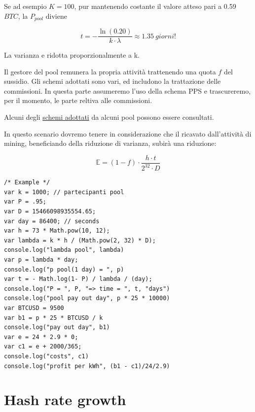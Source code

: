 \documentclass{article}
\begin{document}
Se ad esempio $K = 100$, pur mantenendo costante il valore atteso pari a 0.59 $BTC$, la $P_{pool}$ diviene

\begin{equation}
    t = -\frac{\ln(0.20)}{k \cdot \lambda} \approx 1.35 \ \textit{giorni!} 
\end{equation}

La varianza e ridotta proporzionalmente a k.

Il gestore del pool remunera la propria attività trattenendo una quota $f$ del sussidio. Gli schemi adottati sono vari, ed includono la trattazione delle commissioni. 
In questa parte assumeremo l'uso della schema PPS e trascureremo, per il momento, le parte reltiva alle commissioni.

Alcuni degli \href{https://en.bitcoin.it/wiki/Comparison_of_mining_pools}{schemi adottati} da alcuni pool possono essere consultati.

In questo scenario dovremo tenere in considerazione che il ricavato dall'attività di mining, beneficiando della riduzione di varianza,
subirà una riduzione:

\begin{equation}
    \mathbb{E} = (1 - f) \cdot \frac{h \cdot t}{2^{32} \cdot D} \label{adjusted_lambda}
\end{equation}




\lstset{style=mystyle}
\begin{lstlisting}[language=VBScript]
/* Example */
var k = 1000; // partecipanti pool
var P = .95;
var D = 15466098935554.65;
var day = 86400; // seconds
var h = 73 * Math.pow(10, 12);
var lambda = k * h / (Math.pow(2, 32) * D);
console.log("lambda pool", lambda)
var p = lambda * day;
console.log("p pool(1 day) = ", p)
var t = - Math.log(1- P) / lambda / (day);
console.log("P = ", P, "=> time = ", t, "days")
console.log("pool pay out day", p * 25 * 10000)
var BTCUSD = 9500
var b1 = p * 25 * BTCUSD / k
console.log("pay out day", b1)
var e = 24 * 2.9 * 0;
var c1 = e + 2000/365;
console.log("costs", c1)
console.log("profit per kWh", (b1 - c1)/24/2.9)
\end{lstlisting}

\newpage

\section{Hash rate growth}
\end{document}
